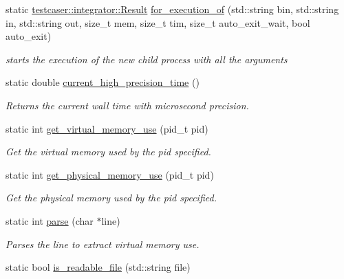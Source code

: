 \begin{DoxyCompactItemize}
\item 
static \mbox{\hyperlink{classtestcaser_1_1integrator_1_1Result}{testcaser\+::integrator\+::\+Result}} \mbox{\hyperlink{structtestcaser_1_1internal_1_1executor__engine_a51f467bc2013c188b5e4454fa919ea70}{for\+\_\+execution\+\_\+of}} (std\+::string bin, std\+::string in, std\+::string out, size\+\_\+t mem, size\+\_\+t tim, size\+\_\+t auto\+\_\+exit\+\_\+wait, bool auto\+\_\+exit)
\begin{DoxyCompactList}\small\item\em starts the execution of the new child process with all the arguments \end{DoxyCompactList}\item 
static double \mbox{\hyperlink{structtestcaser_1_1internal_1_1executor__engine_af3546e4b21e46fc05bb38f014a88ed6f}{current\+\_\+high\+\_\+precision\+\_\+time}} ()
\begin{DoxyCompactList}\small\item\em Returns the current wall time with microsecond precision. \end{DoxyCompactList}\item 
static int \mbox{\hyperlink{structtestcaser_1_1internal_1_1executor__engine_ab70c6b9356bc0dbaf138aa017b048e8a}{get\+\_\+virtual\+\_\+memory\+\_\+use}} (pid\+\_\+t pid)
\begin{DoxyCompactList}\small\item\em Get the virtual memory used by the pid specified. \end{DoxyCompactList}\item 
static int \mbox{\hyperlink{structtestcaser_1_1internal_1_1executor__engine_a7162cc64fce4440e029086bf4f1efc7f}{get\+\_\+physical\+\_\+memory\+\_\+use}} (pid\+\_\+t pid)
\begin{DoxyCompactList}\small\item\em Get the physical memory used by the pid specified. \end{DoxyCompactList}\item 
static int \mbox{\hyperlink{structtestcaser_1_1internal_1_1executor__engine_a80ed3584cab00a573de09502df329919}{parse}} (char $\ast$line)
\begin{DoxyCompactList}\small\item\em Parses the line to extract virtual memory use. \end{DoxyCompactList}\item 
static bool \mbox{\hyperlink{structtestcaser_1_1internal_1_1executor__engine_a3649324b1da2b5fc41627ca7a73135f4}{is\+\_\+readable\+\_\+file}} (std\+::string file)

\end{DoxyCompactItemize}
